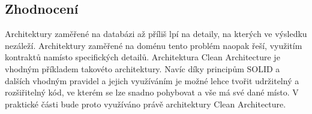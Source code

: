 \subsection{Zhodnocení}

Architektury zaměřené na databázi až příliš lpí na detaily,
na kterých ve výsledku nezáleží.
Architektury zaměřené na doménu tento problém naopak řeší,
využitím kontraktů namísto specifických detailů.
Architektura Clean Architecture je vhodným příkladem takovéto architektury.
Navíc díky principům SOLID a dalších vhodným pravidel a jejich využíváním
je možné lehce tvořit udržitelný a rozšiřitelný kód,
ve kterém se lze snadno pohybovat a vše má své dané místo.
V praktické části bude proto využíváno právě architektury Clean Architecture.
